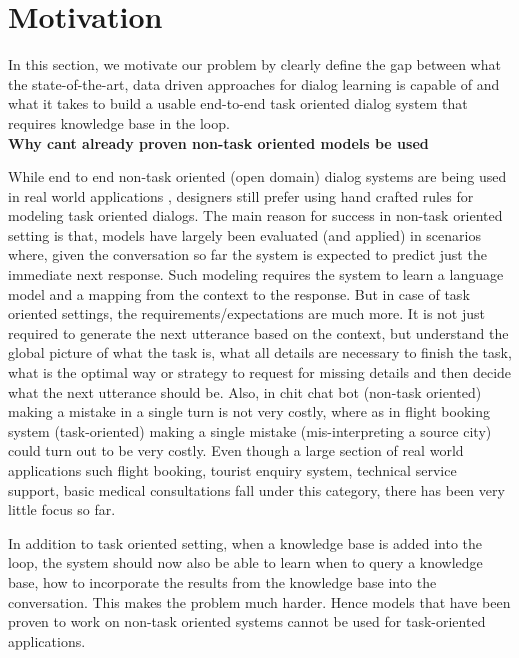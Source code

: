 \section{Motivation}
In this section, we motivate our problem by clearly define the gap between what the state-of-the-art, data driven approaches for dialog learning is capable of and what it takes to build a usable end-to-end task oriented dialog system that requires knowledge base in the loop.\\

\noindent
\textbf{Why cant already proven non-task oriented models be used}

While end to end non-task oriented (open domain) dialog systems are being used in real world applications \cite{smartreply}, designers still prefer using hand crafted rules for modeling task oriented dialogs. The main reason for success in non-task oriented setting is that, models have largely been evaluated (and applied) in scenarios where, given the conversation so far the system is expected to predict just the immediate next response. Such modeling requires the system to learn a language model and a mapping from the context to the response. But in case of task oriented settings, the requirements/expectations are much more. It is not just required to generate the next utterance based on the context, but understand the global picture of what the task is, what all details are necessary to finish the task, what is the optimal way or strategy to request for missing details and then decide what the next utterance should be. Also, in chit chat bot (non-task oriented) making a mistake in a single turn is not very costly, where as in flight booking system (task-oriented) making a single mistake (mis-interpreting a source city) could turn out to be very costly. Even though a large section of real world applications such flight booking, tourist enquiry system, technical service support, basic medical consultations fall under this category, there has been very little focus so far.

In addition to task oriented setting, when a knowledge base is added into the loop, the system should now also be able to learn when to query a knowledge base, how to incorporate the results from the knowledge base into the conversation. This makes the problem much harder. Hence models that have been proven to work on non-task oriented systems cannot be used for task-oriented applications.\\

